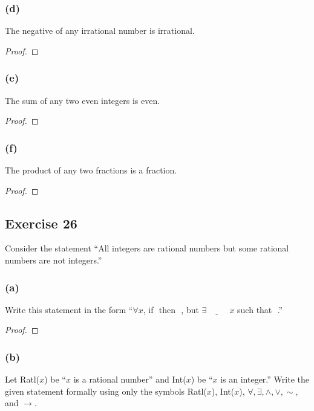 \documentclass[14pt]{extarticle}
\newcommand{\fbl}{\underline{\hspace{1cm}}\,\,}
\newcommand{\fa}{\forall}
\newcommand{\te}{\exists}
\begin{document}
\subsubsection{(d)}
The negative of any irrational number is irrational.

\begin{proof}

\end{proof}

\subsubsection{(e)}
The sum of any two even integers is even.

\begin{proof}

\end{proof}

\subsubsection{(f)}
The product of any two fractions is a fraction.

\begin{proof}

\end{proof}

\subsection{Exercise 26}
Consider the statement “All integers are rational numbers but some rational numbers are not integers.”

\subsubsection{(a)}
Write this statement in the form “$\fa x$, if \fbl then \fbl, but $\te \fbl x$ such that \fbl.”

\begin{proof}

\end{proof}

\subsubsection{(b)}
Let Ratl($x$) be “$x$ is a rational number” and Int($x$) be “$x$ is an integer.” Write the given statement formally using only the symbols Ratl($x$), Int($x$), $\fa, \te, \wedge, \vee, \sim,$ and $\to$.
\end{document}
